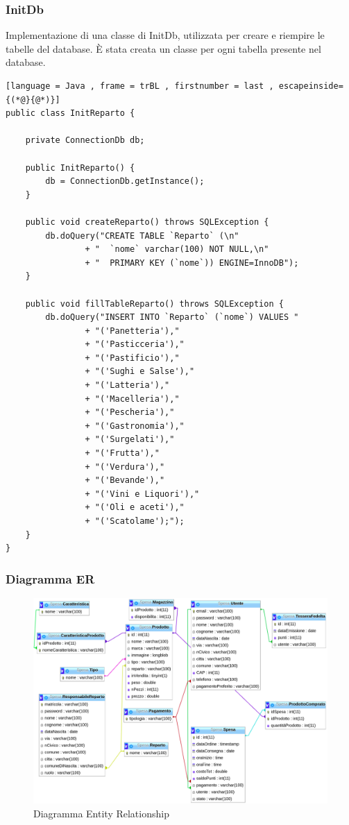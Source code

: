 \documentclass{article}
\begin{document}
\subsubsection{InitDb}
\noindent Implementazione di una classe di InitDb, utilizzata per creare e riempire le tabelle del
database. \`E stata creata un classe per ogni tabella presente nel database.
\begin{lstlisting}[language = Java , frame = trBL , firstnumber = last , escapeinside={(*@}{@*)}]
public class InitReparto {

    private ConnectionDb db;

    public InitReparto() {
        db = ConnectionDb.getInstance();
    }

    public void createReparto() throws SQLException {
        db.doQuery("CREATE TABLE `Reparto` (\n"
                + "  `nome` varchar(100) NOT NULL,\n"
                + "  PRIMARY KEY (`nome`)) ENGINE=InnoDB");
    }

    public void fillTableReparto() throws SQLException {
        db.doQuery("INSERT INTO `Reparto` (`nome`) VALUES "
                + "('Panetteria'),"
                + "('Pasticceria'),"
                + "('Pastificio'),"
                + "('Sughi e Salse'),"
                + "('Latteria'),"
                + "('Macelleria'),"
                + "('Pescheria'),"
                + "('Gastronomia'),"
                + "('Surgelati'),"
                + "('Frutta'),"
                + "('Verdura'),"
                + "('Bevande'),"
                + "('Vini e Liquori'),"
                + "('Oli e aceti'),"
                + "('Scatolame');");
    }
}
\end{lstlisting}
\newpage
\subsubsection{Diagramma ER}
\begin{figure}[h!]
	\centering
	\includegraphics[width=\textwidth]{DiagrammaER.png}
	\caption{Diagramma Entity Relationship}
	\label{fig:DiagrammaER}
\end{figure}
\newpage
\end{document}
